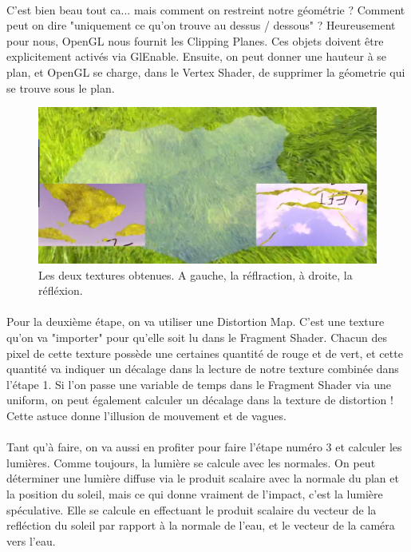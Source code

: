 \documentclass{EPUProjetDi}
\begin{document}
\paragraph{}
C'est bien beau tout ca... mais comment on restreint notre géométrie ? Comment peut on dire "uniquement ce qu'on trouve au dessus / dessous" ?
Heureusement pour nous, OpenGL nous fournit les Clipping Planes. Ces objets doivent être explicitement activés via GlEnable.
Ensuite, on peut donner une hauteur à se plan, et OpenGL se charge, dans le Vertex Shader, de supprimer la géometrie qui se trouve sous le plan.
\begin{figure}[h]
	\centering
	\includegraphics[scale=.3]{water_textures}
	\caption{Les deux textures obtenues. A gauche, la réflraction, à droite, la réfléxion.}
	\label{fig:water_textures}
\end{figure}

\paragraph{}
Pour la deuxième étape, on va utiliser une Distortion Map. C'est une texture qu'on va "importer" pour qu'elle soit lu dans le Fragment Shader.
Chacun des pixel de cette texture possède une certaines quantité de rouge et de vert, et cette quantité va indiquer un décalage dans la lecture de notre texture combinée dans l'étape 1.
Si l'on passe une variable de temps dans le Fragment Shader via une uniform, on peut également calculer un décalage dans la texture de distortion ! Cette astuce donne l'illusion de mouvement et de vagues.

\paragraph{}
Tant qu'à faire, on va aussi en profiter pour faire l'étape numéro 3 et calculer les lumières.
Comme toujours, la lumière se calcule avec les normales. On peut déterminer une lumière diffuse via le produit scalaire avec la normale du plan et la position du soleil, mais ce qui donne vraiment de l'impact, c'est la lumière spéculative.
Elle se calcule en effectuant le produit scalaire du vecteur de la refléction du soleil par rapport à la normale de l'eau, et le vecteur de la caméra vers l'eau.
\end{document}
